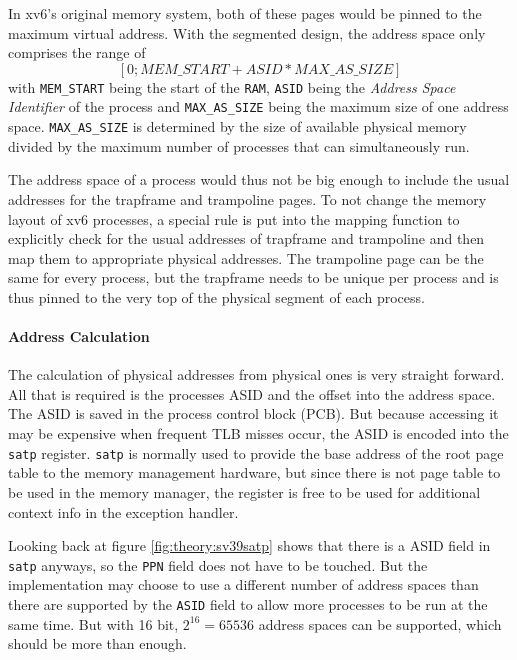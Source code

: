In xv6's original memory system, both of these pages would be pinned to the maximum virtual address.
With the segmented design, the address space only comprises the range of \[
    [0 ; MEM\_START+ASID*MAX\_AS\_SIZE]
\]
with \texttt{MEM\_START} being the start of the \texttt{RAM}, \texttt{ASID} being the \emph{Address Space Identifier} of the process and \texttt{MAX\_AS\_SIZE} being the maximum size of one address space.
\texttt{MAX\_AS\_SIZE} is determined by the size of available physical memory divided by the maximum
number of processes that can simultaneously run.

The address space of a process would thus not be big enough to include the usual addresses for the
trapframe and trampoline pages.
To not change the memory layout of xv6 processes, a special rule is put into the mapping function
to explicitly check for the usual addresses of trapframe and trampoline and then map them to appropriate physical addresses.
The trampoline page can be the same for every process, but the trapframe needs to be unique per
process and is thus pinned to the very top of the physical segment of each process.





\paragraph{Address Calculation}
The calculation of physical addresses from physical ones is very straight forward. All that is required is the processes ASID and the offset into the address space.
The ASID is saved in the process control block (PCB). But because accessing it may be expensive when frequent TLB misses occur, the ASID is encoded into the \texttt{satp} register.
\texttt{satp} is normally used to provide the base address of the root page table to the memory management hardware, but since there is not page table to be used in the memory manager, the register is free to be used for additional context info in the exception handler.

Looking back at figure \ref{fig:theory:sv39satp} shows that there is a ASID field in \texttt{satp} anyways,
so the \texttt{PPN} field does not have to be touched.
But the implementation may choose to use a different number of address spaces than there are supported by the \texttt{ASID} field to allow more processes to be run at the same time.
But with 16 bit, $2^16 = 65536$ address spaces can be supported, which should be more than enough.

